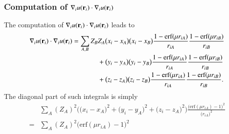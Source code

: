 \documentclass[aip,jcp,reprint,noshowkeys,superscriptaddress]{revtex4-1}
\begin{document}
\subsubsection{Computation of $\nabla_i u({\bf r}_i) \cdot \nabla_i u({\bf r}_i)$}
The computation of $\nabla_i u({\bf r}_i) \cdot \nabla_i u({\bf r}_i)$ leads to 
\begin{equation}
 \begin{aligned}
  \nabla_i u({\bf r}_i) \cdot \nabla_i u({\bf r}_i) =  \sum_{A,B} Z_B &Z_A \big( x_i - x_A \big) \big( x_i - x_B \big)  \frac{ 1 -\text{erf}(\mu r_{iA})}{r_{iA}} \frac{ 1 - \text{erf}(\mu r_{iB})}{r_{iB}} \\
                                                                      & +  \big( y_i - y_A \big) \big( y_i - y_B \big)  \frac{ 1 -\text{erf}(\mu r_{iA})}{r_{iA}} \frac{ 1 - \text{erf}(\mu r_{iB})}{r_{iB}} \\ 
                                                                      & +  \big( z_i - z_A \big) \big( z_i - z_B \big)  \frac{ 1 -\text{erf}(\mu r_{iA})}{r_{iA}} \frac{ 1 - \text{erf}(\mu r_{iB})}{r_{iB}}.
 \end{aligned}
\end{equation}
The diagonal part of such integrals is simply
\begin{equation}
 \begin{aligned}
 &  \sum_{A} (Z_A)^2 \bigg(\big( x_i - x_A \big)^2 +  \big( y_i - y_A \big)^2 + \big( z_i - z_A \big)^2\bigg) \frac{\bigg(\text{erf}(\mu r_{iA}) - 1\bigg)^2}{\big(r_{iA}\big)^2}\\ 
  = & \sum_{A} (Z_A)^2 \bigg( \text{erf}(\mu r_{iA}) -1 \bigg)^2
 \end{aligned}
\end{equation}
\end{document}
